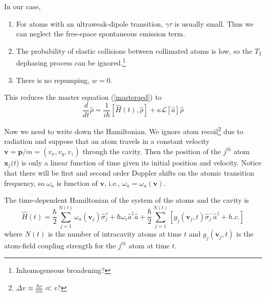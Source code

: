 \documentclass{article}
\newcommand{\omegaa}{\omega_a}
\newcommand{\omegac}{\omega_c}
\newcommand{\lindblad}{\mathcal{L}}
\begin{document}
\bigskip
In our case,
\begin{enumerate}
    \item For atoms with an ultraweak-dipole transition, $\gamma \tau$ is usually small. Thus we can neglect the free-space spontaneous emission term.
    \item  The probability of elastic collisions between collimated atoms is low, so the $T_2$ dephasing process can be ignored.\footnote{Inhomogeneous broadening?}
    \item There is no repumping, $w=0$.
\end{enumerate} 

This reduces the master equation (\ref{masterqed}) to
\begin{equation}
\label{master}
\frac{d}{dt}\hat{\rho}=\frac{1}{i\hbar}\left[\hat{H}(t),\hat{\rho}\right]+\kappa\lindblad[\hat{a}]\hat{\rho}
\end{equation}

Now we need to write down the Hamiltonian. We ignore atom recoil\footnote{$\Delta v \approx \frac{\hbar \nu}{c m} \ll v$?} due to radiation and suppose that an atom travels in a constant velocity $\textbf{v}=\textbf{p}/m=(v_x, v_y, v_z)$ through the cavity. Then the position of the $j^{th}$ atom $\textbf{x}_j(t$) is only a linear function of time given its initial position and velocity. Notice that there will be first and second order Doppler shifts on the atomic transition frequency, so $\omega_a$ is function of $\textbf{v}$, i.e., $\omega_a=\omega_a(\textbf{v})$.




The time-dependent Hamiltonian of the system of the atoms and the cavity is 
\begin{equation}
\label{hamil}
\hat{H}(t)=\frac{\hbar}{2}\sum^{N(t)}_{j=1}\omegaa(\textbf{v}_j)\hat{\sigma}^z_j+\hbar \omegac \hat{a}^{\dagger}\hat{a}+\frac{\hbar}{2}\sum^{N(t)}_{j=1}\left[g_j(\textbf{v}_j,t) \hat{\sigma}^-_j\hat{a}^\dagger+h.c.\right] 
\end{equation}
where $N(t)$ is the number of intracavity atoms at time $t$ and $g_j(\textbf{v}_j,t)$ is the atom-field coupling strength for the $j^{th}$ atom at time $t$. 
\end{document}
